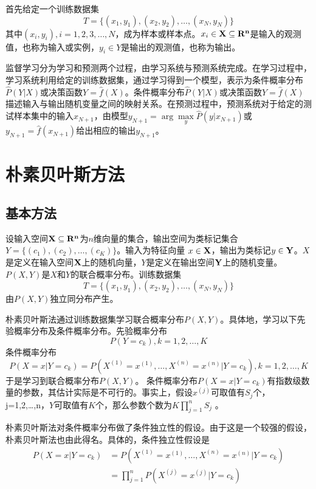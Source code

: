 \documentclass[UTF8]{ctexart}
\begin{document}
首先给定一个训练数据集
$$T=\{(x_1,y_1),(x_2,y_2),\dots,(x_N,y_N)\}$$
其中$(x_i,y_i),i=1,2,3,\dots,N$，成为样本或样本点。$x_i \in \bf X \subseteq \bf R^n $是输入的观测值，也称为输入或实例，$y_i \in Y  $是输出的观测值，也称为输出。

监督学习分为学习和预测两个过程，由学习系统与预测系统完成。在学习过程中，学习系统利用给定的训练数据集，通过学习得到一个模型，表示为条件概率分布$\widehat P(Y|X)$或决策函数$ Y = \widehat f(X)$。条件概率分布$\widehat P(Y|X)$或决策函数$ Y = \widehat f(X)$ 描述输入与输出随机变量之间的映射关系。在预测过程中，预测系统对于给定的测试样本集中的输入$x_{N+1}$，由模型$y_{N+1}=\arg \underset{y}{\max} \widehat P(y|x_{N+1})$或$y_{N+1}=\widehat f(x_{N+1})$给出相应的输出$y_{N+1}$。

\section{朴素贝叶斯方法}
\subsection{基本方法}
设输入空间$ \bf X  \subseteq  \bf R^n $为$n$维向量的集合，输出空间为类标记集合$Y=\{(c_1),(c_2),\dots,(c_K)\}$。输入为特征向量      $x \in \bf X $，输出为类标记$y \in \bf Y$。$X$是定义在输入空间$\bf X$上的随机向量，$Y$是定义在输出空间$\bf Y$上的随机变量。$P(X,Y)$是$X$和$Y$的联合概率分布。训练数据集
$$T=\{(x_1,y_1),(x_2,y_2),\dots,(x_N,y_N)\}$$
由$P(X,Y)$独立同分布产生。

朴素贝叶斯法通过训练数据集学习联合概率分布$P(X,Y)$。具体地，学习以下先验概率分布及条件概率分布。先验概率分布
$$ P(Y=c_k),k=1,2,\dots,K$$
条件概率分布
\begin{equation}
	P(X=x|Y=c_k)=P(X^{(1)}=x^{(1)},\dots,X^{(n)}=x^{(n)}|Y=c_k),k=1,2,\dots,K
\end{equation}
于是学习到联合概率分布$P(X,Y)$。
条件概率分布$ P(X=x|Y=c_k)$有指数级数量的参数，其估计实际是不可行的。事实上，假设$x^{(j)}$可取值有$S_j$个，j=1,2,\dots ,n，$Y$可取值有$K$个，那么参数个数为$K \prod\limits^n_{j=1}S_j$ 。

朴素贝叶斯法对条件概率分布做了条件独立性的假设。由于这是一个较强的假设，朴素贝叶斯法也由此得名。具体的，条件独立性假设是
\begin{equation}
	\begin{aligned}
		P(X=x|Y=c_k) & = P(X^{(1)}=x^{(1)},\dots,X^{(n)}=x^{(n)}|Y=c_k) \\
		\,           & =\prod^n_{j=1}P(X^{(j)}=x^{(j)}|Y=c_k)
	\end{aligned}
\end{equation}
\end{document}
